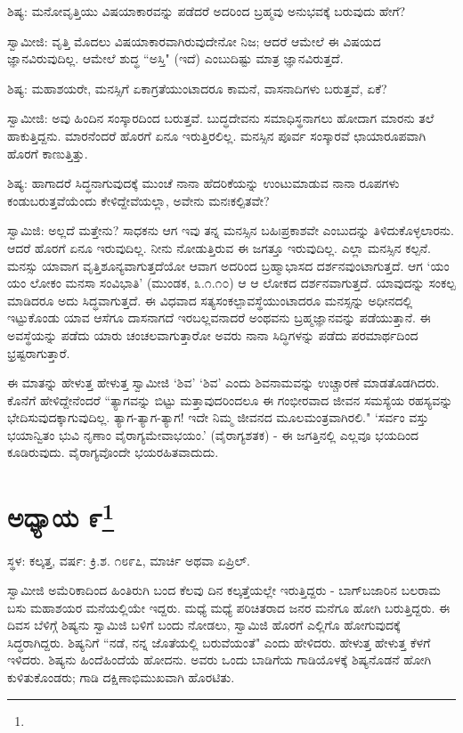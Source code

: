 ಶಿಷ್ಯ: ಮನೋವೃತ್ತಿಯು ವಿಷಯಾಕಾರವನ್ನು ಪಡೆದರೆ ಅದರಿಂದ ಬ್ರಹ್ಮವು ಅನುಭವಕ್ಕೆ ಬರುವುದು ಹೇಗೆ?

ಸ್ವಾಮೀಜಿ: ವೃತ್ತಿ ಮೊದಲು ವಿಷಯಾಕಾರವಾಗಿರುವುದೇನೋ ನಿಜ; ಆದರೆ ಆಮೇಲೆ ಈ ವಿಷಯದ ಜ್ಞಾನವಿರುವುದಿಲ್ಲ. ಆಮೇಲೆ ಶುದ್ಧ “ಅಸ್ತಿ" (ಇದೆ) ಎಂಬುದಿಷ್ಟು ಮಾತ್ರ ಜ್ಞಾನವಿರುತ್ತದೆ.

ಶಿಷ್ಯ: ಮಹಾಶಯರೇ, ಮನಸ್ಸಿಗೆ ಏಕಾಗ್ರತೆಯುಂಟಾದರೂ ಕಾಮನೆ, ವಾಸನಾದಿಗಳು ಬರುತ್ತವೆ, ಏಕೆ?

ಸ್ವಾಮೀಜಿ: ಅವು ಹಿಂದಿನ ಸಂಸ್ಕಾರದಿಂದ ಬರುತ್ತವೆ. ಬುದ್ಧದೇವನು ಸಮಾಧಿಸ್ಥನಾಗಲು ಹೋದಾಗ ಮಾರನು ತಲೆ ಹಾಕುತ್ತಿದ್ದನು. ಮಾರನೆಂದರೆ ಹೊರಗೆ ಏನೂ ಇರುತ್ತಿರಲಿಲ್ಲ. ಮನಸ್ಸಿನ ಪೂರ್ವ ಸಂಸ್ಕಾರವೆ ಛಾಯಾರೂಪವಾಗಿ ಹೊರಗೆ ಕಾಣುತ್ತಿತ್ತು.

ಶಿಷ್ಯ: ಹಾಗಾದರೆ ಸಿದ್ಧನಾಗುವುದಕ್ಕೆ ಮುಂಚೆ ನಾನಾ ಹೆದರಿಕೆಯನ್ನು ಉಂಟುಮಾಡುವ ನಾನಾ ರೂಪಗಳು ಕಂಡುಬರುತ್ತವೆಯೆಂದು ಕೇಳಿದ್ದೇವೆಯಲ್ಲಾ, ಅವೇನು ಮನಃಕಲ್ಪಿತವೇ?

ಸ್ವಾಮಿಜಿ: ಅಲ್ಲದೆ ಮತ್ತೇನು? ಸಾಧಕನು ಆಗ ಇವು ತನ್ನ ಮನಸ್ಸಿನ ಬಹಿಃಪ್ರಕಾಶವೇ ಎಂಬುದನ್ನು ತಿಳಿದುಕೊಳ್ಳಲಾರನು. ಆದರೆ ಹೊರಗೆ ಏನೂ ಇರುವುದಿಲ್ಲ. ನೀನು ನೋಡುತ್ತಿರುವ ಈ ಜಗತ್ತೂ ಇರುವುದಿಲ್ಲ. ಎಲ್ಲಾ ಮನಸ್ಸಿನ ಕಲ್ಪನೆ. ಮನಸ್ಸು ಯಾವಾಗ ವೃತ್ತಿಶೂನ್ಯವಾಗುತ್ತದೆಯೋ ಆವಾಗ ಅದರಿಂದ ಬ್ರಹ್ಮಾಭಾಸದ ದರ್ಶನವುಂಟಾಗುತ್ತದೆ. ಆಗ ‘ಯಂ ಯಂ ಲೋಕಂ ಮನಸಾ ಸಂವಿಭಾತಿ’ (ಮುಂಡಕ, ೩.೧.೧೦) ಆ ಆ ಲೋಕದ ದರ್ಶನವಾಗುತ್ತದೆ. ಯಾವುದನ್ನು ಸಂಕಲ್ಪ ಮಾಡಿದರೂ ಅದು ಸಿದ್ಧವಾಗುತ್ತದೆ. ಈ ವಿಧವಾದ ಸತ್ಯಸಂಕಲ್ಪಾವಸ್ಥೆಯುಂಟಾದರೂ ಮನಸ್ಸನ್ನು ಅಧೀನದಲ್ಲಿ ಇಟ್ಟುಕೊಂಡು ಯಾವ ಆಸೆಗೂ ದಾಸನಾಗದೆ ಇರಬಲ್ಲವನಾದರೆ ಅಂಥವನು ಬ್ರಹ್ಮಜ್ಞಾನವನ್ನು ಪಡೆಯುತ್ತಾನೆ. ಈ ಅವಸ್ಥೆಯನ್ನು ಪಡೆದು ಯಾರು ಚಂಚಲವಾಗುತ್ತಾರೋ ಅವರು ನಾನಾ ಸಿದ್ಧಿಗಳನ್ನು ಪಡೆದು ಪರಮಾರ್ಥದಿಂದ ಭ್ರಷ್ಟರಾಗುತ್ತಾರೆ.

ಈ ಮಾತನ್ನು ಹೇಳುತ್ತ ಹೇಳುತ್ತ ಸ್ವಾಮೀಜಿ ‘ಶಿವ’ ‘ಶಿವ’ ಎಂದು ಶಿವನಾಮವನ್ನು ಉಚ್ಚಾರಣೆ ಮಾಡತೊಡಗಿದರು. ಕೊನೆಗೆ ಹೇಳಿದ್ದೇನೆಂದರೆ “ತ್ಯಾಗವನ್ನು ಬಿಟ್ಟು ಮತ್ತಾವುದರಿಂದಲೂ ಈ ಗಂಭೀರವಾದ ಜೀವನ ಸಮಸ್ಯೆಯ ರಹಸ್ಯವನ್ನು ಭೇದಿಸುವುದಕ್ಕಾಗುವುದಿಲ್ಲ. ತ್ಯಾಗ-ತ್ಯಾಗ-ತ್ಯಾಗ! ಇದೇ ನಿಮ್ಮ ಜೀವನದ ಮೂಲಮಂತ್ರವಾಗಿರಲಿ." ‘ಸರ್ವಂ ವಸ್ತು ಭಯಾನ್ವಿತಂ ಭುವಿ ನೃಣಾಂ ವೈರಾಗ್ಯಮೇವಾಭಯಂ.’ (ವೈರಾಗ್ಯಶತಕ) - ಈ ಜಗತ್ತಿನಲ್ಲಿ ಎಲ್ಲವೂ ಭಯದಿಂದ ಕೂಡಿರುವುದು. ವೈರಾಗ್ಯವೊಂದೇ ಭಯರಹಿತವಾದುದು.

\newpage

\chapter[ಅಧ್ಯಾಯ ೯]{ಅಧ್ಯಾಯ ೯\protect\footnote{}}

\begin{center}
ಸ್ಥಳ: ಕಲ್ಕತ್ತ, ವರ್ಷ: ಕ್ರಿ.ಶ. ೧೮೯೭, ಮಾರ್ಚಿ ಅಥವಾ ಏಪ್ರಿಲ್.
\end{center}

ಸ್ವಾಮೀಜಿ ಅಮೆರಿಕಾದಿಂದ ಹಿಂತಿರುಗಿ ಬಂದ ಕೆಲವು ದಿನ ಕಲ್ಕತ್ತೆಯಲ್ಲೇ ಇರುತ್ತಿದ್ದರು - ಬಾಗ್‌ಬಜಾರಿನ ಬಲರಾಮ ಬಸು ಮಹಾಶಯರ ಮನೆಯಲ್ಲಿಯೇ ಇದ್ದರು. ಮಧ್ಯೆ ಮಧ್ಯೆ ಪರಿಚಿತರಾದ ಜನರ ಮನೆಗೂ ಹೋಗಿ ಬರುತ್ತಿದ್ದರು. ಈ ದಿವಸ ಬೆಳಿಗ್ಗೆ ಶಿಷ್ಯನು ಸ್ವಾಮಿಜಿ ಬಳಿಗೆ ಬಂದು ನೋಡಲು, ಸ್ವಾಮಿಜಿ ಹೊರಗೆ ಎಲ್ಲಿಗೊ ಹೋಗುವುದಕ್ಕೆ ಸಿದ್ಧರಾಗಿದ್ದರು. ಶಿಷ್ಯನಿಗೆ “ನಡೆ, ನನ್ನ ಜೊತೆಯಲ್ಲಿ ಬರುವೆಯಂತೆ" ಎಂದು ಹೇಳಿದರು. ಹೇಳುತ್ತ ಹೇಳುತ್ತ ಕೆಳಗೆ ಇಳಿದರು. ಶಿಷ್ಯನು ಹಿಂದೆಹಿಂದೆಯೆ ಹೋದನು. ಅವರು ಒಂದು ಬಾಡಿಗೆಯ ಗಾಡಿಯೊಳಕ್ಕೆ ಶಿಷ್ಯನೊಡನೆ ಹೋಗಿ ಕುಳಿತುಕೊಂಡರು; ಗಾಡಿ ದಕ್ಷಿಣಾಭಿಮುಖವಾಗಿ ಹೊರಟಿತು.

